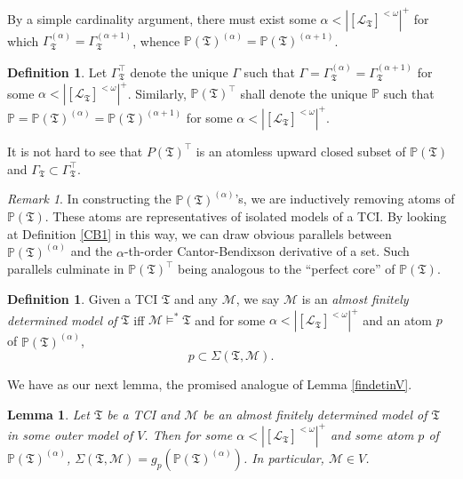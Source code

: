 \documentclass[12pt, twoside]{memoir}
\numberwithin{equation}{section}
\newtheorem{lem}[thm]{Lemma}
\theoremstyle{definition}
\newtheorem{defi}[thm]{Definition}
\theoremstyle{remark}
\newtheorem{rem}[thm]{Remark}
\theoremstyle{definition}
\theoremstyle{definition}
\theoremstyle{definition}
\theoremstyle{remark}
\begin{document}
By a simple cardinality argument, there must exist some $\alpha < |[\mathcal{L}_{\mathfrak{T}}]^{< \omega}|^+$ for which $\Gamma_{\mathfrak{T}}^{(\alpha)} = \Gamma_{\mathfrak{T}}^{(\alpha + 1)}$, whence $\mathbb{P}(\mathfrak{T})^{(\alpha)} = \mathbb{P}(\mathfrak{T})^{(\alpha + 1)}$.

\begin{defi}\label{CB2}
Let $\Gamma_{\mathfrak{T}}^{\top}$ denote the unique $\Gamma$ such that $\Gamma = \Gamma_{\mathfrak{T}}^{(\alpha)} = \Gamma_{\mathfrak{T}}^{(\alpha + 1)}$ for some $\alpha < |[\mathcal{L}_{\mathfrak{T}}]^{< \omega}|^+$. Similarly, $\mathbb{P}(\mathfrak{T})^{\top}$ shall denote the unique $\mathbb{P}$ such that $\mathbb{P} = \mathbb{P}(\mathfrak{T})^{(\alpha)} = \mathbb{P}(\mathfrak{T})^{(\alpha + 1)}$ for some $\alpha < |[\mathcal{L}_{\mathfrak{T}}]^{< \omega}|^+$.
\end{defi}

It is not hard to see that $P(\mathfrak{T})^{\top}$ is an atomless upward closed subset of $\mathbb{P}(\mathfrak{T})$ and $\Gamma_{\mathfrak{T}} \subset \Gamma_{\mathfrak{T}}^{\top}$.

\begin{rem}\label{CBrem}
In constructing the $\mathbb{P}(\mathfrak{T})^{(\alpha)}$'s, we are inductively removing atoms of $\mathbb{P}(\mathfrak{T})$. These atoms are representatives of isolated models of a TCI. By looking at Definition \ref{CB1} in this way, we can draw obvious parallels between $\mathbb{P}(\mathfrak{T})^{(\alpha)}$ and the $\alpha$-th-order Cantor-Bendixson derivative of a set. Such parallels culminate in $\mathbb{P}(\mathfrak{T})^{\top}$ being analogous to the ``perfect core'' of $\mathbb{P}(\mathfrak{T})$.
\end{rem}

\begin{defi}
Given a TCI $\mathfrak{T}$ and any $\mathcal{M}$, we say $\mathcal{M}$ is an \emph{almost finitely determined model of} $\mathfrak{T}$ iff $\mathcal{M} \models^* \mathfrak{T}$ and for some $\alpha < |[\mathcal{L}_{\mathfrak{T}}]^{< \omega}|^+$ and an atom $p$ of $\mathbb{P}(\mathfrak{T})^{(\alpha)}$, $$p \subset \Sigma(\mathfrak{T}, \mathcal{M}).$$
\end{defi}

We have as our next lemma, the promised analogue of Lemma \ref{findetinV}.

\begin{lem}\label{afdinV}
Let $\mathfrak{T}$ be a TCI and $\mathcal{M}$ be an almost finitely determined model of $\mathfrak{T}$ in some outer model of $V$. Then for some $\alpha < |[\mathcal{L}_{\mathfrak{T}}]^{< \omega}|^+$ and some atom $p$ of $\mathbb{P}(\mathfrak{T})^{(\alpha)}$, $\Sigma(\mathfrak{T}, \mathcal{M}) = g_p (\mathbb{P}(\mathfrak{T})^{(\alpha)})$. In particular, $\mathcal{M} \in V$.
\end{lem}
\end{document}
